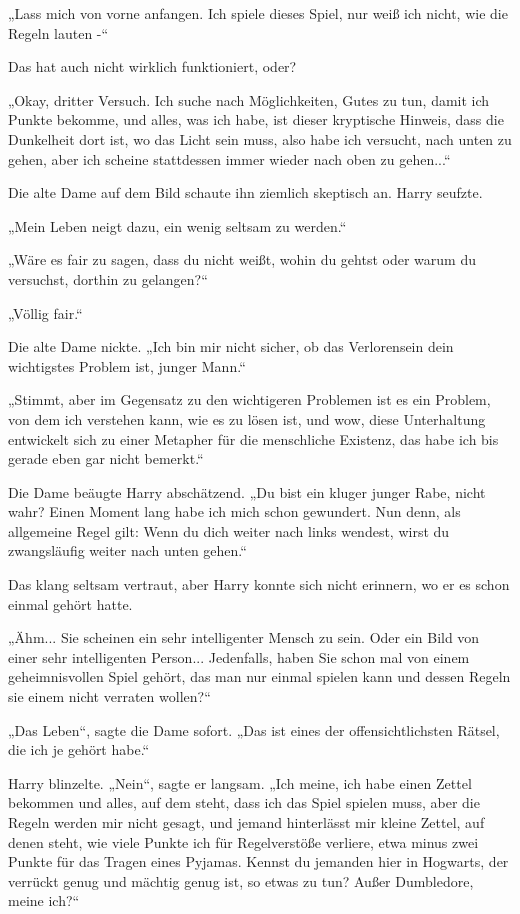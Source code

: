 {„Lass mich von vorne anfangen. Ich spiele dieses Spiel, nur weiß ich nicht, wie die Regeln lauten -“

Das hat auch nicht wirklich funktioniert, oder?

„Okay, dritter Versuch. Ich suche nach Möglichkeiten, Gutes zu tun, damit ich Punkte bekomme, und alles, was ich habe, ist dieser kryptische Hinweis, dass die Dunkelheit dort ist, wo das Licht sein muss, also habe ich versucht, nach unten zu gehen, aber ich scheine stattdessen immer wieder nach oben zu gehen...“

Die alte Dame auf dem Bild schaute ihn ziemlich skeptisch an. Harry seufzte.

„Mein Leben neigt dazu, ein wenig seltsam zu werden.“

„Wäre es fair zu sagen, dass du nicht weißt, wohin du gehtst oder warum du versuchst, dorthin zu gelangen?“

„Völlig fair.“

Die alte Dame nickte. „Ich bin mir nicht sicher, ob das Verlorensein dein wichtigstes Problem ist, junger Mann.“

„Stimmt, aber im Gegensatz zu den wichtigeren Problemen ist es ein Problem, von dem ich verstehen kann, wie es zu lösen ist, und wow, diese Unterhaltung entwickelt sich zu einer Metapher für die menschliche Existenz, das habe ich bis gerade eben gar nicht bemerkt.“

Die Dame beäugte Harry abschätzend. „Du bist ein kluger junger Rabe, nicht wahr? Einen Moment lang habe ich mich schon gewundert. Nun denn, als allgemeine Regel gilt: Wenn du dich weiter nach links wendest, wirst du zwangsläufig weiter nach unten gehen.“

Das klang seltsam vertraut, aber Harry konnte sich nicht erinnern, wo er es schon einmal gehört hatte.

„Ähm... Sie scheinen ein sehr intelligenter Mensch zu sein. Oder ein Bild von einer sehr intelligenten Person... Jedenfalls, haben Sie schon mal von einem geheimnisvollen Spiel gehört, das man nur einmal spielen kann und dessen Regeln sie einem nicht verraten wollen?“

„Das Leben“, sagte die Dame sofort. „Das ist eines der offensichtlichsten Rätsel, die ich je gehört habe.“

Harry blinzelte. „Nein“, sagte er langsam. „Ich meine, ich habe einen Zettel bekommen und alles, auf dem steht, dass ich das Spiel spielen muss, aber die Regeln werden mir nicht gesagt, und jemand hinterlässt mir kleine Zettel, auf denen steht, wie viele Punkte ich für Regelverstöße verliere, etwa minus zwei Punkte für das Tragen eines Pyjamas. Kennst du jemanden hier in Hogwarts, der verrückt genug und mächtig genug ist, so etwas zu tun? Außer Dumbledore, meine ich?“

}
